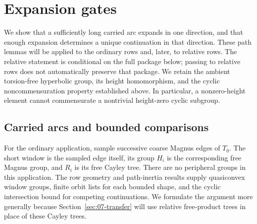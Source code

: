 \section{Expansion gates}\label{sec:05-gates}

We show that a sufficiently long carried arc expands in one direction,
and that enough expansion determines a unique continuation in that
direction. These path lemmas will be applied to the ordinary rows and,
later, to relative rows.  The relative statement is conditional on the full
package below; passing to relative rows does not automatically preserve that
package.  We retain the ambient torsion-free hyperbolic group, its height
homomorphism, and the cyclic noncommensuration property established above.
In particular, a nonzero-height element cannot commensurate a nontrivial
height-zero cyclic subgroup.

\subsection{Carried arcs and bounded comparisons}

For the ordinary application, sample successive coarse Magnus edges
of \(T_0\). The short window is the sampled edge itself, its group
\(H_i\) is the corresponding free Magnus group, and \(R_i\) is its
free Cayley tree. There are no peripheral groups in this application.
The row geometry and path-inertia results supply quasiconvex window
groups, finite orbit lists for each bounded shape, and the cyclic
intersection bound for competing continuations. We formulate the
argument more generally because Section~\ref{sec:07-transfer} will
use relative free-product trees in place of these Cayley trees.

